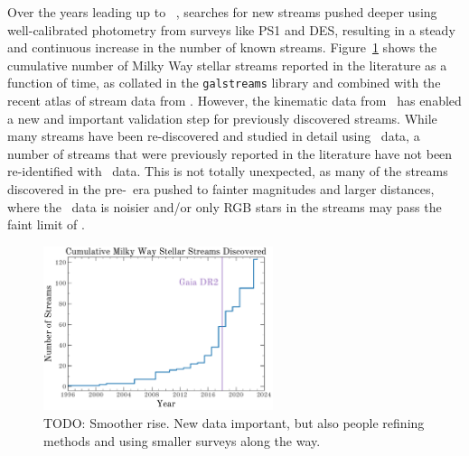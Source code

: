 \documentclass[final,5p,times,twocolumn,authoryear]{elsarticle}
\begin{document}
Over the years leading up to \gaia\ , searches for new streams pushed deeper using
well-calibrated photometry from surveys like PS1 and DES, resulting in a steady and
continuous increase in the number of known streams.
Figure~\ref{fig:num-streams} shows the cumulative number of Milky Way stellar streams
reported in the literature as a function of time, as collated in the \texttt{galstreams}
\citep{mateu:2023} library and combined with the recent atlas of stream data from
\citet{ibata:2024}.
However, the kinematic data from \gaia\ has enabled a new and important validation step
for previously discovered streams.
While many streams have been re-discovered and studied in detail using \gaia\ data, a
number of streams that were previously reported in the literature have not been
re-identified with \gaia\ data.
This is not totally unexpected, as many of the streams discovered in the pre-\gaia\ era
pushed to fainter magnitudes and larger distances, where the \gaia\ data is noisier
and/or only RGB stars in the streams may pass the faint limit of \gaia.

\begin{figure}[t!]
    \begin{center}
    \includegraphics[width=0.6\textwidth]{cumulative-num-streams.pdf}
    \end{center}
    \caption{%
    TODO: Smoother rise. New data important, but also people refining methods and using smaller surveys along the way.
    \label{fig:num-streams}
    }
\end{figure}
\end{document}
